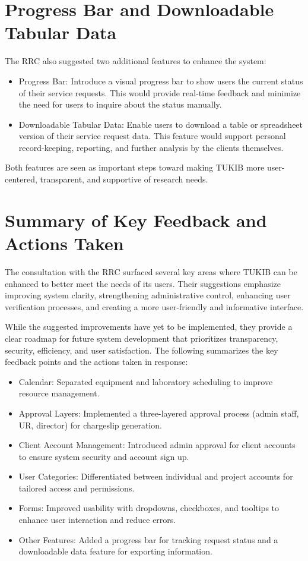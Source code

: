 \section{Progress Bar and Downloadable Tabular Data}
The RRC also suggested two additional features to enhance the system:

\begin{itemize}
	\item Progress Bar: Introduce a visual progress bar to show users the current status of their service requests. This would provide real-time feedback and minimize the need for users to inquire about the status manually.
	\item Downloadable Tabular Data: Enable users to download a table or spreadsheet version of their service request data. This feature would support personal record-keeping, reporting, and further analysis by the clients themselves.
\end{itemize}

Both features are seen as important steps toward making TUKIB more user-centered, transparent, and supportive of research needs.

\section{Summary of Key Feedback and Actions Taken}
The consultation with the RRC surfaced several key areas where TUKIB can be enhanced to better meet the needs of its users. Their suggestions emphasize improving system clarity, strengthening administrative control, enhancing user verification processes, and creating a more user-friendly and informative interface.

While the suggested improvements have yet to be implemented, they provide a clear roadmap for future system development that prioritizes transparency, security, efficiency, and user satisfaction. The following summarizes the key feedback points and the actions taken in response:

\begin{itemize}
	\item Calendar: Separated equipment and laboratory scheduling to improve resource management.
	\item Approval Layers: Implemented a three-layered approval process (admin staff, UR, director) for chargeslip generation.
	\item Client Account Management: Introduced admin approval for client accounts to ensure system security and account sign up.
	\item User Categories: Differentiated between individual and project accounts for tailored access and permissions.
	\item Forms: Improved usability with dropdowns, checkboxes, and tooltips to enhance user interaction and reduce errors.
	\item Other Features: Added a progress bar for tracking request status and a downloadable data feature for exporting information.
\end{itemize}

